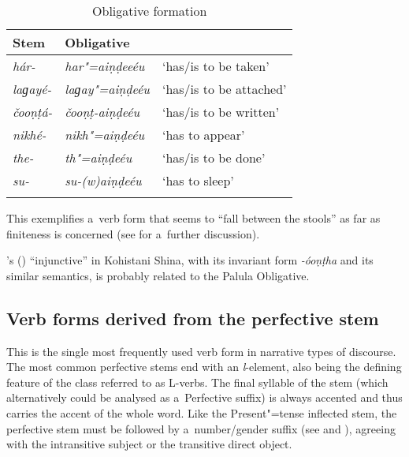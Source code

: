 \begin{table}[ht]
\caption{Obligative formation}

\begin{tabularx}{.75\textwidth}{ l@{\hspace{20pt}} Q l@{\hspace{20pt}} }
\lsptoprule
Stem &
Obligative &
\\\hline
\textit{hár-} &
\textit{har"=aiṇḍeeéu} &
`has/is to be taken'\\
\textit{laɡayé-} &
\textit{laɡay"=aiṇḍeéu} &
`has/is to be attached'\\
\textit{čooṇṭá-} &
\textit{čooṇṭ-aiṇḍeéu} &
`has/is to be written'\\
\textit{nikhé-} &
\textit{nikh"=aiṇḍeéu} &
`has to appear'\\
\textit{the-} &
\textit{th"=aiṇḍeéu} &
`has/is to be done'\\
\textit{su-} &
\textit{su-(w)aiṇḍeéu} &
`has to sleep'\\\lspbottomrule
\end{tabularx}
\label{tab:8-27}
\end{table}


This exemplifies a~verb form that seems to ``fall between the stools'' as far as finiteness is concerned (see  for a~further discussion).



\citeauthor{schmidt2003}'s (\citeyear[139]{schmidt2003}) ``injunctive'' in Kohistani Shina, with its invariant form \textit{-óoṇṭha} and its similar semantics, is probably related to the Palula Obligative.


\subsection{Verb forms derived from the perfective stem}
\label{subsec:8-4-3}

 This is the single most frequently used verb form in
narrative types of discourse. The most common perfective stems end with an \textit{l}-element,
also being the defining feature of the class referred to as L-verbs. The final syllable of the stem
(which alternatively could be analysed as a~Perfective suffix) is always accented and thus carries
the accent of the whole word. Like the Present"=tense inflected stem, the perfective stem must be
followed by a~number/gender suffix (see  and ), agreeing with
the intransitive subject or the transitive direct object.



